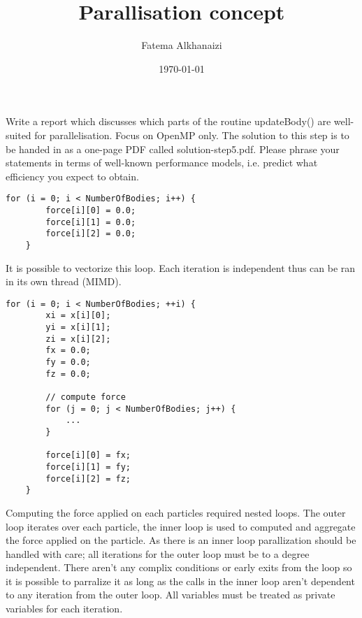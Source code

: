 \documentclass[11pt]{article}
\title{Parallisation concept}
\author{Fatema Alkhanaizi}
\date{\today}
\begin{document}
    \maketitle
    Write a report which discusses which parts of the routine updateBody() are well-suited for parallelisation. Focus on OpenMP only. The solution to this step is to be handed in as a one-page PDF called solution-step5.pdf. Please phrase your statements in terms of well-known performance models, i.e. predict what efficiency you expect to obtain.

    \begin{lstlisting}[style=CStyle]
    for (i = 0; i < NumberOfBodies; i++) {
        force[i][0] = 0.0;
        force[i][1] = 0.0;
        force[i][2] = 0.0;
    }
    \end{lstlisting}
    It is possible to vectorize this loop. Each iteration is independent thus can be ran in its own thread (MIMD).
    
    \begin{lstlisting}[style=CStyle]
    for (i = 0; i < NumberOfBodies; ++i) {
        xi = x[i][0];
        yi = x[i][1];
        zi = x[i][2];
        fx = 0.0;
        fy = 0.0;
        fz = 0.0;

        // compute force
        for (j = 0; j < NumberOfBodies; j++) {
            ...
        }

        force[i][0] = fx;
        force[i][1] = fy;
        force[i][2] = fz;
    }
    \end{lstlisting}
    Computing the force applied on each particles required nested loops. The outer loop iterates over each particle, the inner loop is used to computed and aggregate the force applied on the particle. As there is an inner loop parallization should be handled with care; all iterations for the outer loop must be to a degree independent. There aren't any complix conditions or early exits from the loop so it is possible to parralize it as long as the calls in the inner loop aren't dependent to any iteration from the outer loop. All variables must be treated as private variables for each iteration.
    
\end{document}
